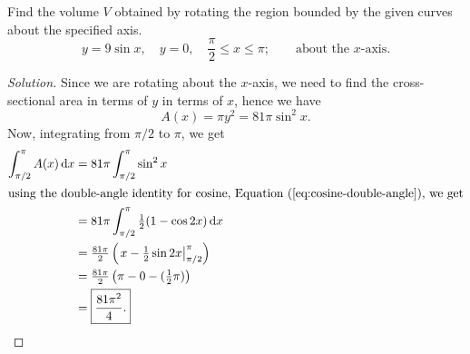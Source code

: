 \begin{problem}[WebAssign HW 10, 8]
Find the volume $V$ obtained by rotating the region bounded by the given
curves about the specified axis.
\[
y=9\sin x,\quad
y=0,\quad
\frac{\pi}{2}\leq x\leq\pi;\qquad
\text{about the $x$-axis.}
\]
\end{problem}
\begin{proof}[Solution]
Since we are rotating about the $x$-axis, we need to find the
cross-sectional area in terms of $y$ in terms of $x$, hence we have
\[
A(x)=\pi y^2=81\pi\sin^2 x.
\]
Now, integrating from $\pi/2$ to $\pi$, we get
\begin{align*}
\int_{\pi/2}^\pi A(x)\,\mathrm{d} x
&=81\pi\int_{\pi/2}^\pi \sin^2 x\\
\shortintertext{using the double-angle identity for cosine, Equation
  (\ref{eq:cosine-double-angle}), we get}
&=81\pi\int_{\pi/2}^\pi \tfrac{1}{2}(1-\cos 2x)\,\mathrm{d} x\\
&=\tfrac{81\pi}{2}\left(\left.x-\tfrac{1}{2}\sin 2x\right|_{\pi/2}^\pi\right)\\
&=\tfrac{81\pi}{2}\left(\pi-0-(\tfrac{1}{2}\pi)\right)\\
&=\boxed{\frac{81\pi^2}{4}.}
\end{align*}
\end{proof}

